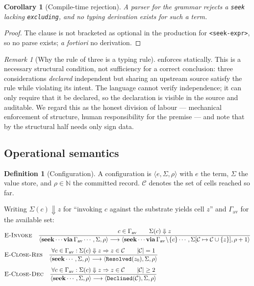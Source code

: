 \documentclass[11pt,a4paper]{article}
\theoremstyle{clstyle}
\newtheorem{corollary}[theorem]{Corollary}
\theoremstyle{definition}
\newtheorem{definition}[theorem]{Definition}
\theoremstyle{remark}
\newtheorem{remark}[theorem]{Remark}
\newcommand{\N}{\mathbb{N}}
\newcommand{\abs}[1]{\lvert#1\rvert}
\newcommand{\seekop}{\mathbf{seek}}
\newcommand{\via}{\mathbf{via}}
\begin{document}
\begin{corollary}[Compile-time rejection]
\label{cor:reject}
A parser for the grammar rejects a \texttt{seek} lacking \texttt{excluding},
and no typing derivation exists for such a term.
\end{corollary}

\begin{proof}
The clause is not bracketed as optional in the production for
\texttt{<seek-expr>}, so no parse exists; \emph{a fortiori} no derivation.
\end{proof}

\begin{remark}[Why the rule of three is a typing rule]
\label{rem:three-typing}
 enforces  statically. This is a
necessary structural condition, not sufficiency for a correct conclusion:
three considerations \emph{declared} independent but sharing an upstream
source satisfy the rule while violating its intent. The language cannot
verify independence; it can only require that it be declared, so the
declaration is visible in the source and auditable. We regard this as the
honest division of labour --- mechanical enforcement of structure, human
responsibility for the premise --- and note that by  the
structural half needs only sign data.
\end{remark}

\subsection{Operational semantics}

\begin{definition}[Configuration]
\label{def:config}
A configuration is $\langle e,\Sigma,\rho\rangle$ with $e$ the term, $\Sigma$
the value store, and $\rho\in\N$ the committed record. $\mathcal{C}$ denotes
the set of cells reached so far.
\end{definition}

Writing $\Sigma(c)\Downarrow z$ for ``invoking $c$ against the substrate
yields cell $z$'' and $\Gamma_{\mathrm{av}}$ for the available set:
\begin{align*}
&\textsc{E-Invoke}\quad
\frac{c\in\Gamma_{\mathrm{av}}\qquad \Sigma(c)\Downarrow z}
{\langle\seekop\cdots\via\,\Gamma_{\mathrm{av}}\cdots,\Sigma,\rho\rangle
\longrightarrow
\langle\seekop\cdots\via\,\Gamma_{\mathrm{av}}\!\setminus\!\{c\}\cdots,
\Sigma[\mathcal{C}\mapsto\mathcal{C}\cup\{z\}],\rho+1\rangle}\\[4pt]
&\textsc{E-Close-Res}\quad
\frac{\forall c\in\Gamma_{\mathrm{av}}:\Sigma(c)\Downarrow z\Rightarrow
z\in\mathcal{C}\qquad \abs{\mathcal{C}}=1}
{\langle\seekop\cdots,\Sigma,\rho\rangle\longrightarrow
\langle\texttt{Resolved}(z_0),\Sigma,\rho\rangle}\\[4pt]
&\textsc{E-Close-Dec}\quad
\frac{\forall c\in\Gamma_{\mathrm{av}}:\Sigma(c)\Downarrow z\Rightarrow
z\in\mathcal{C}\qquad \abs{\mathcal{C}}\ge2}
{\langle\seekop\cdots,\Sigma,\rho\rangle\longrightarrow
\langle\texttt{Declined}(\mathcal{C}),\Sigma,\rho\rangle}
\end{align*}
\end{document}
